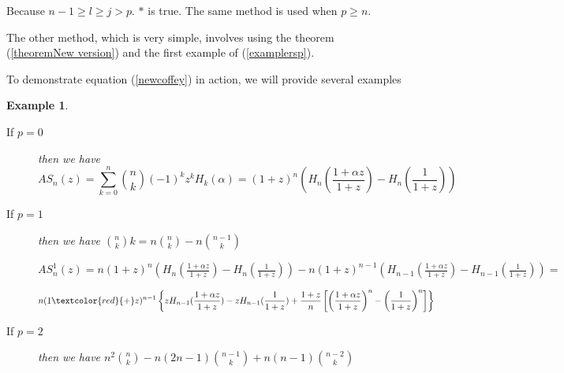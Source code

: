 \documentclass[a4paper,10pt,oneside]{article}
\newcommand{\col}[2]{ \textcolor{#1}{#2}}
\newtheorem{example}{Example}[section]
\theoremstyle{definition}
\theoremstyle{remark}
\begin{document}
\begin{description}
\begin{itemize}
 Because $n-1\geq l\geq j>p$.  $*$ is true. The same method is used when $p\ge n$.\par
  The other method, which is very simple, involves using the theorem (\ref{theoremNew version}) and the first example of (\ref{examplersp}).
\end{itemize}
\end{description}

 To demonstrate equation (\ref{newcoffey}) in action, we will provide several examples\par 
 
\begin{example}
 \begin{description}

  \item [If $p=0$ ]  then we have
  $$AS_n(z)=\sum_{k=0}^n\binom{n}{k}(-1)^kz^kH_k(\alpha)=(1+z)^n\left(H_n(\frac{1+\alpha z}{1+z})-H_n(\frac{1}{1+z})\right)$$

 \item [If  $p=1$ ] then we have $\binom{n}{k}k= n\binom{n}{k}-n\binom{n-1}{k}$\;\par
  $AS_n^1(z)=n(1+z)^{n}\left(H_{n}(\frac{1+\alpha z}{1+z})-H_{n}(\frac{1}{1+z})\right)-n(1+z)^{n-1} \left(H_{n-1}(\frac{1+\alpha z}{1+z})-H_{n-1}(\frac{1}{1+z}) \right)=$\par
 \begin{eqnarray}
   n(1\col{red}{+}z)^{n-1}\left\{zH_{n-1}(\frac{1+\alpha z}{1+z})-zH_{n-1}(\frac{1}{1+z})+\frac{1+z}{n}\left[\left(\frac{1+\alpha z}{1+z}\right)^n-\left(\frac{1}{1+z}\right)^n\right]\right\}\label{exemple1}
   \end{eqnarray}
  \item[If  $p=2$ ] then we have $ n^2\binom{n}{k}-n(2n-1)\binom{n-1}{k} +n(n-1)\binom{n-2}{k}$\;\par
 


\end{description}
\end{example}
\end{document}

